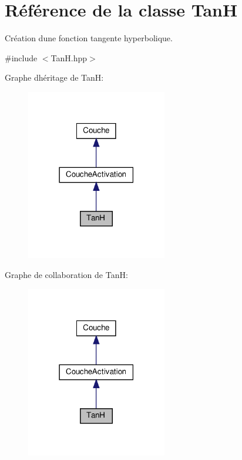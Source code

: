 \hypertarget{classTanH}{}\section{Référence de la classe TanH}
\label{classTanH}


Création d\textquotesingle{}une fonction tangente hyperbolique.  




{\ttfamily \#include $<$Tan\+H.\+hpp$>$}



Graphe d\textquotesingle{}héritage de TanH\+:
\nopagebreak
\begin{figure}[H]
\begin{center}
\leavevmode
\includegraphics[width=174pt]{classTanH__inherit__graph}
\end{center}
\end{figure}


Graphe de collaboration de TanH\+:
\nopagebreak
\begin{figure}[H]
\begin{center}
\leavevmode
\includegraphics[width=174pt]{classTanH__coll__graph}
\end{center}
\end{figure}
